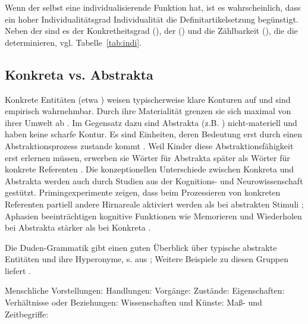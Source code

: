 \noindent
Wenn der  selbst eine individualisierende Funktion hat, ist es wahrscheinlich, dass ein hoher Individualitätsgrad Individualität die Definitartikelsetzung  begünstigt. Neben der  sind es der Konkretheitsgrad  (), der   () und die Zählbarkeit (), die 
die   determinieren, vgl. Tabelle~\ref{tab:indi}.

\subsection{Konkreta vs. Abstrakta}\label{sec:konabst}

Konkrete  Entitäten (etwa ) weisen typischerweise klare Konturen auf und sind empirisch wahrnehmbar. Durch ihre Materialität grenzen sie sich maximal von ihrer Umwelt ab \parencite[344]{Szczepaniak2011}. Im Gegensatz dazu sind Abstrakta (z.B. ) nicht-materiell und haben keine scharfe Kontur. Es sind Einheiten, deren Bedeutung erst durch einen Abstraktionsprozess zustande kommt \parencite[279]{Ewald1992}. Weil Kinder diese Abstraktionsfähigkeit erst erlernen müssen, erwerben sie Wörter für Abstrakta  später als Wörter für konkrete  Referenten \parencite[396]{Bergelson2013}. Die konzeptionellen Unterschiede zwischen Konkreta  und Abstrakta  werden auch durch Studien aus der Kognitions- und Neurowissenschaft gestützt. Primingexperimente zeigen, dass beim Prozessieren von konkreten  Referenten partiell andere Hirnareale aktiviert werden als bei abstrakten  Stimuli \parencite{Binder2005,Weiss2013}; Aphasien beeinträchtigen kognitive Funktionen wie Memorieren und Wiederholen bei Abstrakta  stärker als bei  Konkreta \parencite{Moss1995,Moss1997}.

Die Duden-Grammatik gibt einen guten Überblick über typische abstrakte Entitäten  und ihre Hyperonyme, s.  aus \textcite[146--147]{Duden2009}; Weitere Beispiele zu diesen Gruppen liefert \textcite[143]{Schrauf2011}.\largerpage

\begin{exe}
	\ex \label{ex:abstrakta}
	\begin{xlist}
		\ex \label{ex:vorstellung} Menschliche Vorstellungen: 
		\ex \label{ex:handlungen} Handlungen: 
		\ex \label{ex:vorgang} Vorgänge: 
		\ex \label{ex:zustand} Zustände: 
		\ex \label{ex:eigenschaft} Eigenschaften:  
		\ex \label{ex:verhaeltnise} Verhältnisse oder Beziehungen: 
		\ex \label{ex:wissenschaft} Wissenschaften und Künste: 
		\ex \label{ex:zeit} Maß- und Zeitbegriffe: 
	\end{xlist}
\end{exe} 

